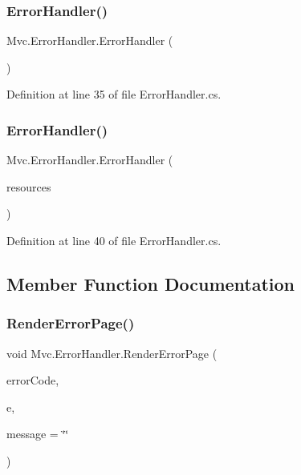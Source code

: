 \subsubsection{\texorpdfstring{Error\+Handler()}{ErrorHandler()}\hspace{0.1cm}{\footnotesize\ttfamily [1/2]}}
{\footnotesize\ttfamily Mvc.\+Error\+Handler.\+Error\+Handler (\begin{DoxyParamCaption}{ }\end{DoxyParamCaption})}



Definition at line 35 of file Error\+Handler.\+cs.

\mbox{\label{class_mvc_1_1_error_handler_a974f3fdae71752f2b98da9b03997aae5}} 
\subsubsection{\texorpdfstring{Error\+Handler()}{ErrorHandler()}\hspace{0.1cm}{\footnotesize\ttfamily [2/2]}}
{\footnotesize\ttfamily Mvc.\+Error\+Handler.\+Error\+Handler (\begin{DoxyParamCaption}\item[{string}]{resources }\end{DoxyParamCaption})}



Definition at line 40 of file Error\+Handler.\+cs.



\subsection{Member Function Documentation}
\mbox{\label{class_mvc_1_1_error_handler_aa320769f4764a66166616eb4ad26950a}} 
\subsubsection{\texorpdfstring{Render\+Error\+Page()}{RenderErrorPage()}\hspace{0.1cm}{\footnotesize\ttfamily [1/2]}}
{\footnotesize\ttfamily void Mvc.\+Error\+Handler.\+Render\+Error\+Page (\begin{DoxyParamCaption}\item[{int}]{error\+Code,  }\item[{\hyperlink{class_p_http_1_1_http_request_event_args}{Http\+Request\+Event\+Args}}]{e,  }\item[{string}]{message = {\ttfamily \char`\"{}\char`\"{}} }\end{DoxyParamCaption})}



